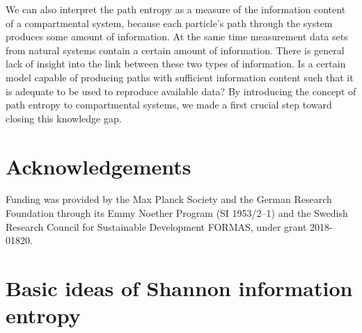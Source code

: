 \documentclass[smallextended]{svjour3}
\begin{document}
We can also interpret the path entropy as a measure of the information content of a compartmental system, because each particle's path through the system produces some amount of information.
At the same time measurement data sets from natural systems contain a certain amount of information.
There is general lack of insight into the link between these two types of information.
Is a certain model capable of producing paths with sufficient information content such that it is adequate to be used to reproduce available data?
By introducing the concept of path entropy to compartmental systems, we made a first crucial step toward closing this knowledge gap.




\section{Acknowledgements}
Funding was provided by the Max Planck Society and the German Research Foundation through its Emmy Noether Program (SI 1953/2--1) and the Swedish Research Council for Sustainable Development FORMAS, under grant 2018-01820.






\appendix

\section{Basic ideas of Shannon information entropy}
\label{sec:entropy_basics_extended}
\end{document}
